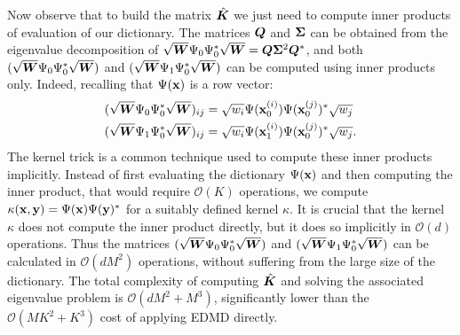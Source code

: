 Now observe that to build the matrix $\hat{\vb*{K}}$ we just need to compute inner products of evaluation of our dictionary. The matrices $\vb*{Q}$ and $\vb*{\Sigma}$ can be obtained from the eigenvalue decomposition of $\sqrt{\vb*{W}}\Psi_0\Psi_0^*\sqrt{\vb*{W}} = \vb*{Q}\vb*{\Sigma}^2\vb*{Q}^*$, and both $(\sqrt{\vb*{W}}\Psi_0\Psi_0^*\sqrt{\vb*{W}})$ and $(\sqrt{\vb*{W}}\Psi_1\Psi_0^*\sqrt{\vb*{W}})$ can be computed using inner products only. Indeed, recalling that $\Psi(\vb{x})$ is a row vector:
\begin{equation}
    \label{kernel_matrices}
    \begin{split}
        (\sqrt{\vb*{W}}\Psi_0\Psi_0^*\sqrt{\vb*{W}})_{ij} &= \sqrt{w_i} \Psi(\vb{x}_0^{(i)}) \Psi(\vb{x}_0^{(j)})^* \sqrt{w_j}\\
        (\sqrt{\vb*{W}}\Psi_1\Psi_0^*\sqrt{\vb*{W}})_{ij} &= \sqrt{w_i} \Psi(\vb{x}_1^{(i)}) \Psi(\vb{x}_0^{(j)})^* \sqrt{w_j}.
    \end{split}
\end{equation}
The kernel trick \cite{bishop_pattern_2006} is a common technique used to compute these inner products implicitly. Instead of first evaluating the dictionary $\Psi(\vb{x})$ and then computing the inner product, that would require $\mathcal{O}(K)$ operations, we compute $\kappa(\vb{x}, \vb{y}) = \Psi(\vb{x})\Psi(\vb{y})^*$ for a suitably defined kernel $\kappa$. It is crucial that the kernel $\kappa$ does not compute the inner product directly, but it does so implicitly in $\mathcal{O}(d)$ operations. Thus the matrices $(\sqrt{\vb*{W}}\Psi_0\Psi_0^*\sqrt{\vb*{W}})$ and $(\sqrt{\vb*{W}}\Psi_1\Psi_0^*\sqrt{\vb*{W}})$ can be calculated in $\mathcal{O}(dM^2)$ operations, without suffering from the large size of the dictionary. The total complexity of computing $\hat{\vb*{K}}$ and solving the associated eigenvalue problem is $\mathcal{O}(d M^2 + M^3)$, significantly lower than the $\mathcal{O}(M K^2+K^3)$ cost of applying EDMD directly. 

